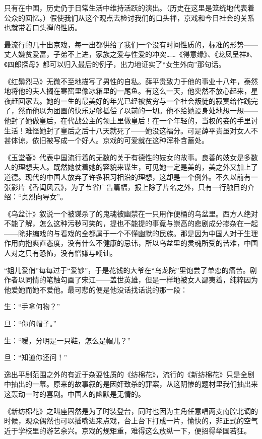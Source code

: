 \par 只有在中国，历史仍于日常生活中维持活跃的演出。（历史在这里是笼统地代表着公众的回忆。）假使我们从这个观点去检讨我们的口头禅，京戏和今日社会的关系也就带着口头禅的性质。
\par 最流行的几十出京戏，每一出都供给了我们一个没有时间性质的，标准的形势——丈人嫌贫爱富，子弟不上进，家族之爱与性爱的冲突……《得意缘》、《龙凤呈祥》、《四郎探母》都可以归入最后的例子，出力地证实了“女生外向”那句话。
\par 《红鬃烈马》无微不至地描写了男性的自私。薛平贵致力于他的事业十八年，泰然地将他的夫人搁在寒窑里像冰箱里的一尾鱼。有这么一天，他突然不放心起来，星夜赶回家去。她的一生的最美好的年光已经被贫穷与一个社会叛徒的寂寞给作践完了，然而他以为团圆的快乐足够抵偿了以前的一切。他不给她设身处地想一想——他封了她做皇后，在代战公主的领土里做皇后！在一个年轻的，当权的妾的手里讨生活！难怪她封了皇后之后十八天就死了——她没这福分。可是薛平贵虽对女人不甚体谅，依旧被写成一个好人。京戏的可爱就在这种浑朴含蓄处。
\par 《玉堂春》代表中国流行着的无数的关于有德性的妓女的故事。良善的妓女是多数人的理想夫人。既然她仗着她的容貌来谋生，可见她一定是美的，美之外又加上了道德。现代的中国人放弃了许多积习相沿的理想，这却是一个例外。不久以前有一张影片《香闺风云》，为了节省广告篇幅，报上除了片名之外，只有一行触目的介绍：“贞烈向导女”。
\par 《乌盆计》叙说一个被谋杀了的鬼魂被幽禁在一只用作便桶的乌盆里。西方人绝对不能了解，怎么这种污秽可笑的，提也不能提的事竟与崇高的悲剧成分掺杂在一起——除非编戏的与看戏的全都属于一个不懂幽默的民族。那是因为中国人对于生理作用向抱爽直态度，没有什么不健康的忌讳，所以乌盆里的灵魂所受的苦难，中国人对之只有恐怖，没有憎嫌与嘲讪。
\par “姐儿爱俏”每每过于“爱钞”，于是花钱的大爷在“乌龙院”里饱尝了单恋的痛苦。剧作者以同情的笔触勾画了宋江——盖世英雄，但是一样地被女人鄙夷着，纯粹因为他爱她而她不爱他。最可悲的便是他没话找话说的那一段：
\par 生：“手拿何物？”
\par 旦：“你的帽子。”
\par 生：“嗳，分明是一只鞋，怎么是帽儿？”
\par 旦：“知道你还问！”
\par 逸出平剧范围之外的有近于杂耍性质的《纺棉花》，流行的《新纺棉花》只是全剧中抽出的一幕。原来的故事叙的是因奸致杀的罪案，从这阴惨的题材里我们抽出来这轰动一时的喜剧。中国人的幽默是无情的。
\par 《新纺棉花》之叫座固然是为了时装登台，同时也因为主角任意唱两支南腔北调的时候，观众偶然也可以插嘴进来点戏，台上台下打成一片，愉快的，非正式的空气近于学校里的游艺余兴。京戏的规矩重，难得这么放纵一下，便招得举国若狂。
